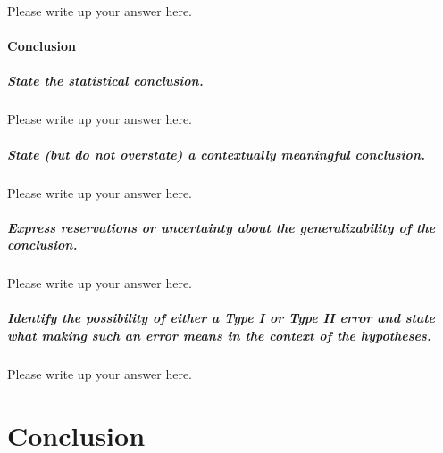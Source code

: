 \documentclass[
]{book}
\begin{document}
Please write up your answer here.

\hypertarget{conclusion}{%
\paragraph*{Conclusion}\label{conclusion}}

\hypertarget{state-the-statistical-conclusion.}{%
\subparagraph*{State the statistical conclusion.}\label{state-the-statistical-conclusion.}}

Please write up your answer here.

\hypertarget{state-but-do-not-overstate-a-contextually-meaningful-conclusion.}{%
\subparagraph*{State (but do not overstate) a contextually meaningful conclusion.}\label{state-but-do-not-overstate-a-contextually-meaningful-conclusion.}}

Please write up your answer here.

\hypertarget{express-reservations-or-uncertainty-about-the-generalizability-of-the-conclusion.}{%
\subparagraph*{Express reservations or uncertainty about the generalizability of the conclusion.}\label{express-reservations-or-uncertainty-about-the-generalizability-of-the-conclusion.}}

Please write up your answer here.

\hypertarget{identify-the-possibility-of-either-a-type-i-or-type-ii-error-and-state-what-making-such-an-error-means-in-the-context-of-the-hypotheses.}{%
\subparagraph*{Identify the possibility of either a Type I or Type II error and state what making such an error means in the context of the hypotheses.}\label{identify-the-possibility-of-either-a-type-i-or-type-ii-error-and-state-what-making-such-an-error-means-in-the-context-of-the-hypotheses.}}

Please write up your answer here.

\hypertarget{hypothesis1-conclusion}{%
\section{Conclusion}\label{hypothesis1-conclusion}}
\end{document}
